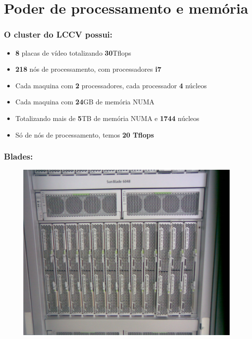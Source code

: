 \documentclass[10pt]{beamer}
\begin{document}
\section{Poder de processamento e memória}
		\begin{frame}%
		\frametitle{O cluster do LCCV possui:}
			\begin{itemize}%
				\item \textbf{8} placas de vídeo totalizando \textbf{30}Tflops
				\item \textbf{218} nós de processamento, com processadores \textbf{i7}
				\item Cada maquina com \textbf{2} processadores, cada processador \textbf{4} núcleos
				\item Cada maquina com \textbf{24}GB de memória NUMA
				\item Totalizando mais de \textbf{5}TB de memória NUMA e \textbf{1744} núcleos
				\item Só de nós de processamento, temos \textbf{20 Tflops}
			\end{itemize}
		\end{frame}

		\begin{frame}%
		\frametitle{Blades:}
			\begin{figure}
			\centering
				\includegraphics[scale=0.15]{./figuras/gaveta_blades.jpg}
			\end{figure}
		\end{frame}
\end{document}
